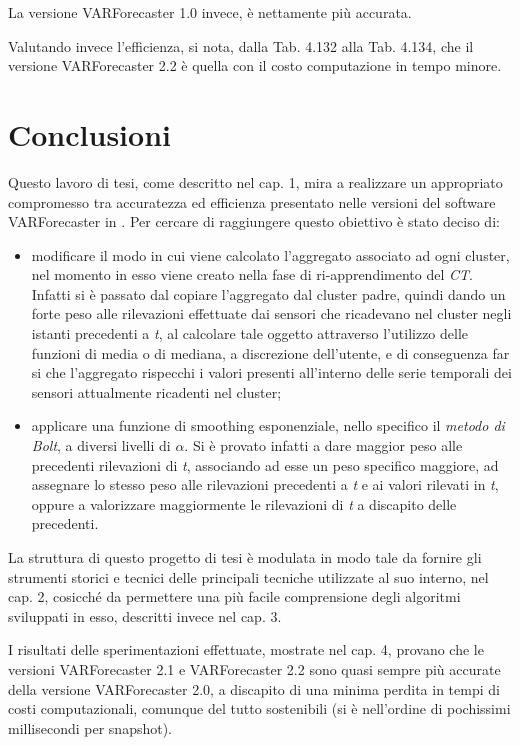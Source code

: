 \documentclass[12pt,a4paper,oneside,openright]{book}
\begin{document}
La versione VARForecaster 1.0 invece, è nettamente più accurata.

Valutando invece l'efficienza, si nota, dalla Tab. 4.132 alla Tab. 4.134, che il versione VARForecaster 2.2 è quella con il costo computazione in tempo minore.

\chapter{Conclusioni}
Questo lavoro di tesi, come descritto nel cap. 1, mira a realizzare un appropriato compromesso tra accuratezza ed efficienza presentato nelle versioni del software VARForecaster in \cite{donato}. Per cercare di raggiungere questo obiettivo è stato deciso di:
\begin{itemize}
\item modificare il modo in cui viene calcolato l'aggregato associato ad ogni cluster, nel momento in esso viene creato nella fase di ri-apprendimento del \textit{CT}. Infatti si è passato dal copiare l'aggregato dal cluster padre, quindi dando un forte peso alle rilevazioni effettuate dai sensori che ricadevano nel cluster negli istanti precedenti a \textit{t}, al calcolare tale oggetto attraverso l'utilizzo delle funzioni di media o di mediana, a discrezione dell'utente, e di conseguenza far si che l'aggregato rispecchi i valori presenti all'interno delle serie temporali dei sensori attualmente ricadenti nel cluster;
\item applicare una funzione di smoothing esponenziale, nello specifico il \textit{metodo di Bolt}, a diversi livelli di $\alpha$. Si è provato infatti a dare maggior peso alle precedenti rilevazioni di \textit{t}, associando ad esse un peso specifico maggiore, ad assegnare lo stesso peso alle rilevazioni precedenti a \textit{t} e ai valori rilevati in \textit{t}, oppure a valorizzare maggiormente le rilevazioni di \textit{t} a discapito delle precedenti.
\end{itemize}

La struttura di questo progetto di tesi è modulata in modo tale da fornire gli strumenti storici e tecnici delle principali tecniche utilizzate al suo interno, nel cap. 2, cosicché da permettere una più facile comprensione degli algoritmi sviluppati in esso, descritti invece nel cap. 3. 

I risultati delle sperimentazioni effettuate, mostrate nel cap. 4, provano che le versioni VARForecaster 2.1 e VARForecaster 2.2 sono quasi sempre più accurate della versione VARForecaster 2.0, a discapito di una minima perdita in tempi di costi computazionali, comunque del tutto sostenibili (si è nell'ordine di pochissimi millisecondi per snapshot).
\end{document}
